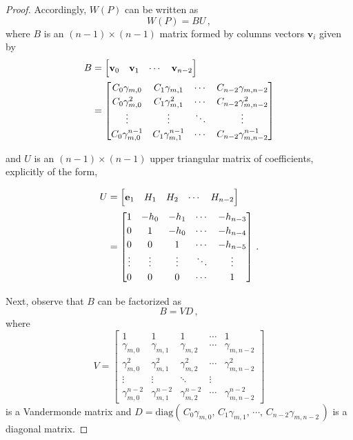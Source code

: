 \documentclass[11pt,oneside]{article}
\theoremstyle{plain}
\theoremstyle{plain}
\theoremstyle{definition}
\numberwithin{figure}{section}
\theoremstyle{remark}
\numberwithin{equation}{section}
\begin{document}
\begin{proof}
			
			Accordingly, $W(P)$ can be written as
			\[
			W(P) = B U\,,
			\]
			where $B$ is an $(n-1)\times(n-1)$ matrix formed by columns vectors $\mathbf{v}_i$ given by
			\begin{align*}
				\renewcommand{\arraystretch}{1.3}
				B &= \begin{bmatrix}
					\mathbf{v}_0 & \mathbf{v}_1 & \cdots & \mathbf{v}_{n-2} 
				\end{bmatrix}\\
				& =
				\begin{bmatrix}
					C_0\gamma_{m,0} & C_1\gamma_{m,1} & \cdots & C_{n-2}\gamma_{m,n-2} \\
					C_0\gamma_{m,0}^2 & C_1\gamma_{m,1}^2 & \cdots & C_{n-2}\gamma_{m,n-2}^2 \\
					\vdots & \vdots & \ddots & \vdots \\
					C_0\gamma_{m,0}^{n-1} & C_1\gamma_{m,1}^{n-1} & \cdots & C_{n-2}\gamma_{m,n-2}^{n-1}
				\end{bmatrix}
			\end{align*}
			
			and $U$ is an $(n-1)\times(n-1)$ upper triangular matrix of coefficients, explicitly of the form,
			
			\begin{align*}
				\renewcommand{\arraystretch}{1.3}
				U &= \begin{bmatrix}
					\mathbf{e}_1 & H_1 & H_2 & \cdots & H_{n-2} 
				\end{bmatrix}\\
				& =
				\begin{bmatrix}
					1 & -h_0 & -h_1 & \cdots & -h_{n-3} \\
					0 & 1 & -h_0 & \cdots & -h_{n-4} \\
					0 & 0 & 1 & \cdots & -h_{n-5} \\
					\vdots & \vdots & \vdots & \ddots & \vdots \\
					0 & 0 & 0 & \cdots & 1
				\end{bmatrix}\,. 
			\end{align*}
			
			Next, observe that $B$ can be factorized as
			\[
			B = V D\,,
			\]
			where
			\[\renewcommand{\arraystretch}{1.2}
			V =
			\begin{bmatrix}
				1 & 1 & 1 & \cdots & 1 \\
				\gamma_{m,0} & \gamma_{m,1}& \gamma_{m,2} & \cdots & \gamma_{m,n-2} \\
				\gamma_{m,0}^2 & \gamma_{m,1}^2 & \gamma_{m,2}^2 & \cdots & \gamma_{m,n-2}^2 \\
				\vdots & \vdots & \ddots & \vdots \\
				\gamma_{m,0}^{n-2} & \gamma_{m,1}^{n-2} &\gamma_{m,2}^{n-2} & \cdots & \gamma_{m,n-2}^{n-2}
			\end{bmatrix}
			\]%
			is a Vandermonde matrix and
			$
			D = \mathrm{diag}(\,C_0 \gamma_{m,0},\, C_1 \gamma_{m,1},\, \cdots  ,\, C_{n-2} \gamma_{m,n-2}\,)
			$
			is a diagonal matrix.
			

\end{proof}
\end{document}
